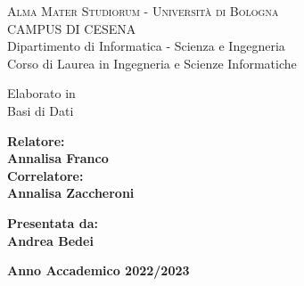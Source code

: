 \documentclass[a4paper,final,12pt]{report}
\begin{document}
\newenvironment{dedication}
{\clearpage           %
  \pagenumbering{gobble}
  \thispagestyle{empty}%
  \vspace*{\stretch{1}}%
  \itshape             %
  \raggedleft          %
}
{\par %
  \vspace{\stretch{3}} %
  \clearpage           %
  \pagenumbering{arabic}
}

\begin{titlepage}
  \begin{center}
  {{\Large{\textsc{Alma Mater Studiorum - Università di
  Bologna}}}}\\
  {\small{CAMPUS DI CESENA\\}}
  \vspace{5mm}
  {\small Dipartimento di Informatica - Scienza e Ingegneria \\
  Corso di Laurea in Ingegneria e Scienze Informatiche}
  \end{center}
  
  \vspace{15mm}
  \vspace{40mm}
  \par
  \noindent
  
  \begin{center}
    \large{Elaborato in \\
    Basi di Dati}
  \end{center}
  \vspace{20mm}
  \par
  \noindent
  
  \begin{minipage}[t]{0.47\textwidth}
  {\large{\bf Relatore:\\
  Annalisa Franco\\}}
  {\large{\bf Correlatore:\\
  Annalisa Zaccheroni}}
  \end{minipage}
  \hfill
  \begin{minipage}[t]{0.47\textwidth}\raggedleft
  {\large{\bf Presentata da:\\
  Andrea Bedei}}
  \end{minipage}
  \vspace{20mm}
  \begin{center}
  {\large{\bf Anno Accademico 2022/2023}}
  \end{center}
\end{titlepage}
\end{document}

